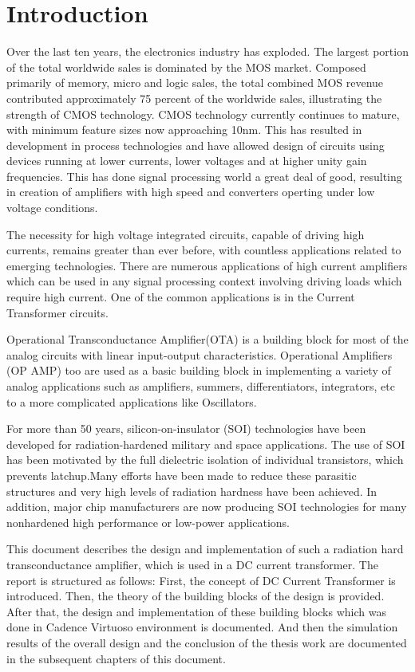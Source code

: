 \chapter{Introduction}
Over the last ten years, the electronics industry has exploded. The largest portion of the total worldwide sales is dominated by the MOS market. Composed primarily of memory, micro and logic sales, the total combined MOS revenue contributed approximately 75 percent of the worldwide sales, illustrating the strength of CMOS technology. CMOS technology currently continues to mature, with minimum feature sizes now approaching 10nm. This has resulted in development in process technologies and have allowed design of circuits using devices running at lower currents, lower voltages and at higher unity gain frequencies. This has done signal processing world a great deal of good, resulting in creation of amplifiers with high speed and converters operting under low voltage conditions.

The necessity for high voltage integrated circuits, capable of driving high currents, remains greater than ever before, with countless applications related to emerging technologies. There are numerous applications of high current amplifiers which can be used in any signal processing context involving driving loads which require high current. One of the common applications is in the Current Transformer circuits.

Operational Transconductance Amplifier(OTA) is a building block for most of the analog circuits with linear input-output characteristics. Operational Amplifiers (OP AMP) too are used as a basic building block in implementing a variety of analog applications such as amplifiers, summers, differentiators, integrators, etc to a more complicated applications like Oscillators. 

For more than 50 years, silicon-on-insulator (SOI) technologies have been developed for radiation-hardened military and space applications.  The  use  of  SOI  has  been  motivated  by  the  full dielectric  isolation  of  individual  transistors,  which  prevents
latchup.Many efforts have been made to reduce these parasitic structures and very high levels of radiation hardness have been achieved. In addition, major chip manufacturers are now producing SOI technologies for many nonhardened high performance or low-power applications.

This document describes the design and implementation of such a radiation hard transconductance amplifier, which is used in a DC current transformer. The report is structured as follows: First, the concept of DC Current Transformer is introduced. Then, the theory of the building blocks of the design is provided. After that, the design and implementation of these building blocks which was done in Cadence Virtuoso environment is documented. And then the simulation results of the overall design and the conclusion of the thesis work are documented in the subsequent chapters of this document.

